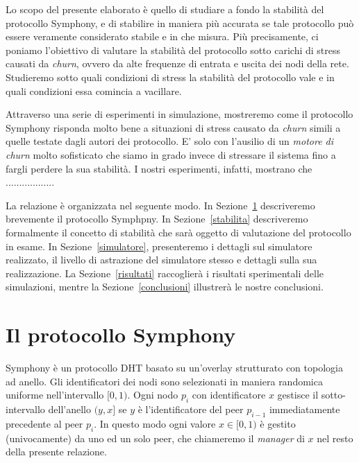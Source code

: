 \documentclass[prodmode,acmtap]{acmlarge}
\begin{document}
Lo scopo del presente elaborato è quello di studiare a fondo la stabilità del protocollo Symphony, e di stabilire in maniera più accurata se tale protocollo può essere veramente considerato stabile e in che misura. Più precisamente, ci poniamo l'obiettivo di valutare la stabilità del protocollo sotto carichi di stress causati da \emph{churn}, ovvero da alte frequenze di entrata e uscita dei nodi della rete. Studieremo sotto quali condizioni di stress la stabilità del protocollo vale e in quali condizioni essa comincia a vacillare.

Attraverso una serie di esperimenti in simulazione, mostreremo come il protocollo Symphony risponda molto bene a situazioni di stress causato da \emph{churn} simili a quelle testate dagli autori dei protocollo. E' solo con l'ausilio di un \emph{motore di churn} molto sofisticato che siamo in grado invece di stressare il sistema fino a fargli perdere la sua stabilità. I nostri esperimenti, infatti, mostrano che ..................

La relazione è organizzata nel seguente modo. In Sezione~\ref{symphony} descriveremo brevemente il protocollo Symphpny. In Sezione~\ref{stabilita} descriveremo formalmente il concetto di stabilità che sarà oggetto di valutazione del protocollo in esame. In Sezione~\ref{simulatore}, presenteremo i dettagli sul simulatore realizzato, il livello di astrazione del simulatore stesso e dettagli sulla sua realizzazione. La Sezione~\ref{risultati} raccoglierà i risultati sperimentali delle simulazioni, mentre la Sezione~\ref{conclusioni} illustrerà le nostre conclusioni.





\section{Il protocollo Symphony} \label{symphony}
Symphony è un protocollo DHT basato su un'overlay strutturato con topologia ad anello. Gli identificatori dei nodi sono selezionati in maniera randomica uniforme nell'intervallo $[0,1)$. Ogni nodo $p_i$ con identificatore $x$ gestisce il sotto-intervallo dell'anello $(y,x]$ se $y$ è l'identificatore del peer $p_{i-1}$ immediatamente precedente al peer $p_i$. In questo modo ogni valore $x \in [0,1)$ è gestito (univocamente) da uno ed un solo peer, che chiameremo il \emph{manager} di $x$ nel resto della presente relazione.
\end{document}
